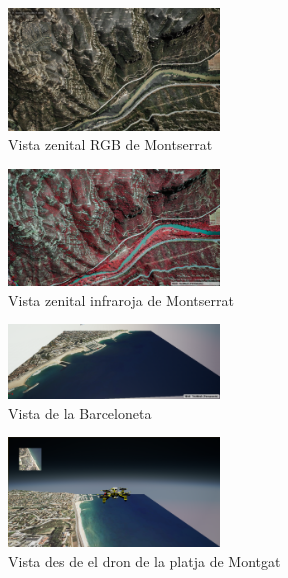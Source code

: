 \documentclass[10pt,a4paper]{article}
\begin{document}
\begin{figure}[!h]
\centering
    \includegraphics[width=0.5\textwidth]{cenitalview}
  \caption{Vista zenital RGB de Montserrat}
  \label{fig-cenitalview}
\end{figure}

\begin{figure}[!h]
\centering
    \includegraphics[width=0.5\textwidth]{cenitalviewir}
  \caption{Vista zenital infraroja de Montserrat}
  \label{fig-montserratir}
\end{figure}

\begin{figure}[!h]
\centering
    \includegraphics[width=0.5\textwidth]{barceloneta}
  \caption{Vista de la Barceloneta}
  \label{fig-barceloneta}
\end{figure}

\begin{figure}[!h]
\centering
    \includegraphics[width=0.5\textwidth]{simulator_example}
  \caption{Vista des de el dron de la platja de Montgat}
  \label{fig-viewdrone}
\end{figure}
\end{document}
